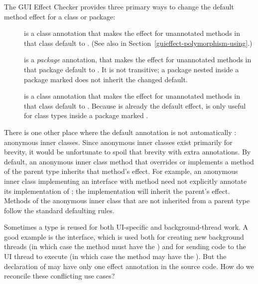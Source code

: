 The GUI Effect Checker provides three primary ways to change the default method effect for a class
or package:
\begin{description}
\item[]
  is a class annotation that makes the effect for unannotated methods in
  that class default to .  (See also  in
  Section~\ref{guieffect-polymorphism-using}.)
\item[]
  is a \emph{package} annotation, that makes the effect for unannotated
  methods in that package default to .  It is not
  transitive; a package nested inside a package marked 
  does not inherit the changed default.
\item[]
  is a class annotation that makes the effect for unannotated methods in
  that class default to .  Because  is
  already the default effect,  is only useful for class
  types inside a package marked .
\end{description}

There is one other place where the default annotation is not automatically :
anonymous inner classes.  Since anonymous inner classes exist primarily for brevity, it would be
unfortunate to spoil that brevity with extra annotations.  By default, an anonymous inner class
method that overrides or implements a method of the parent type inherits that method's effect.
For example, an anonymous inner class implementing an interface with method  need not explicitly annotate its implementation of ; the implementation will inherit
the parent's effect.  Methods of the anonymous inner class that are not inherited from a parent type
follow the standard defaulting rules.



Sometimes a type is reused for both UI-specific and background-thread work.  A good example is the
 interface, which is used both for creating new background threads (in which case the
 method must have the ) and for sending code to the UI thread to
execute (in which case the  method may have the
).  But the declaration of
 may have only one effect annotation in the source code.
How do we reconcile these
conflicting use cases?


